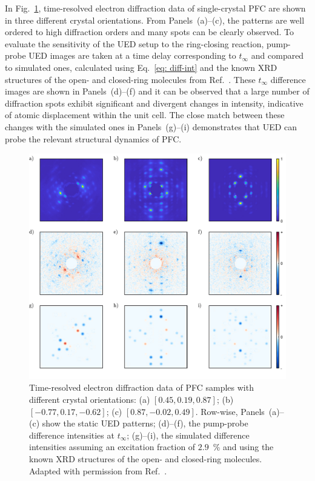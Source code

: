 In Fig.~\ref{fig: DAE-PFC-UED}, time-resolved electron diffraction data
of single-crystal PFC are shown in three different crystal orientations.
From Panels~(a)--(c), the patterns are well ordered to high diffraction orders and
many spots can be clearly observed.
%
To evaluate the sensitivity of the UED setup to the ring-closing reaction,
pump-probe UED images are taken at a time delay corresponding to $t_\infty$
and compared to simulated ones, calculated using Eq.~\eqref{eq: diff-int}
and the known XRD structures of the open- and closed-ring molecules from Ref.~\cite{Irie2001}.
%
These $t_\infty$ difference images are shown in Panels~(d)--(f) and
it can be observed that a large number of diffraction spots exhibit
significant and divergent changes in intensity, indicative of
atomic displacement within the unit cell.
%
The close match between these changes with the simulated ones in Panels~(g)--(i)
demonstrates that UED can probe the relevant structural dynamics of PFC.
%
\begin{figure}[ht!]
  \centering
  \includegraphics[width = \textwidth]{Figures/fig_DAE_PFC_UED_.pdf}
  \caption[Time-resolved electron diffraction patterns of PFC.]{
    Time-resolved electron diffraction data of PFC samples
    with different crystal orientations:
    (a) $[ 0.45, 0.19, 0.87]$; (b) $[ -0.77, 0.17, -0.62]$; (c) $[ 0.87, -0.02, 0.49]$.
    Row-wise, Panels~(a)--(c) show the static UED patterns;
    (d)--(f), the pump-probe difference intensities at $t_\infty$;
    (g)--(i), the simulated difference intensities assuming an excitation fraction of $2.9$~\%
    and using the known XRD structures of the open- and closed-ring molecules.
    Adapted with permission from Ref.~\cite{Jean-Ruel2013}.
  }
  \label{fig: DAE-PFC-UED}
\end{figure}

